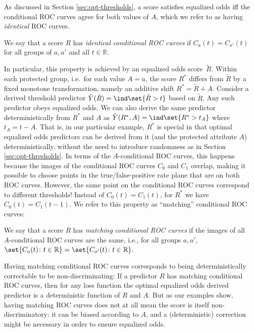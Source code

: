 As discussed in Section \ref{sec:opt-thresholds}, a score satisfies
equalized odds iff the conditional ROC curves agree for both values of
$A$, which we refer to as having \emph{identical} ROC curves.
\begin{definition}
We say that a score $R$ has \emph{identical conditional ROC curves} if
$C_a(t)=C_{a'}(t)$
for all groups of $a,a'$ and all $t\in\mathbb{R}$.
\end{definition}
In particular, this property is achieved by an equalized odds 
score~$\tilde{R}$.
%
Within each protected group, i.e.~for each value $A=a$, the score
$R^*$ differs from $\tilde{R}$ by a fixed monotone transformation,
namely an additive shift $R^*=\tilde{R}+A$.  Consider a derived
threshold predictor $\hat{Y}(\tilde{R})=\ind\set{\tilde{R}>t}$ based
on $\tilde{R}$.  Any such predictor obeys equalized odds.  We can also
derive the same predictor deterministically from $R^*$ and $A$ as
$\hat{Y}(R^*,A)=\ind\set{R^*>t_A}$ where $t_A=t-A$.  That is, in our
particular example, $R^*$ is special in that optimal equalized odds
predictors can be derived from it (and the protected attribute $A$)
deterministically, without the need to introduce randomness as in
Section \ref{sec:opt-thresholds}.  In terms of the $A$-conditional ROC
curves, this happens because the images of the conditional ROC curves
$C_0$ and $C_1$ overlap, making it possible to choose points in the
true/false-positive rate plane that are on both ROC curves.  However,
the same point on the conditional ROC curves correspond to different
thresholds!  Instead of $C_0(t)=C_1(t)$, for $R^*$ we have
$C_0(t)=C_1(t-1)$.  We refer to this property as ``matching''
conditional ROC curves:
\begin{definition}
We say that a score $R$ has \emph{matching conditional ROC curves} if
the images of all $A$-conditional ROC curves are the same, i.e.,
for all groups $a,a',$
$\set{ C_a(t) \colon t\in\mathbb{R} } = \set{ C_{a'}(t) \colon
  t\in\mathbb{R} }.$
\end{definition}
Having matching conditional ROC curves corresponds to being
deterministically correctable to be non-discriminating: If a predictor
$R$ has matching conditional ROC curves, then for any loss function
the optimal equalized odds derived predictor is a deterministic
function of $R$ and $A$.  But as our examples show, having matching
ROC curves does not at all mean the score is itself
non-discriminatory: it can be biased according to $A$, and a
(deterministic) correction might be necessary in order to ensure
equalized odds.

